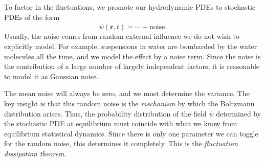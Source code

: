 \documentclass[a4paper]{article}
\begin{document}
To factor in the fluctuations, we promote our hydrodynamic PDEs to stochastic PDEs of the form
\[
  \dot{\psi}(\mathbf{r}, t) = \cdots + \text{noise}.
\]
Usually, the noise comes from random external influence we do not wish to explicitly model. For example, suspensions in water are bombarded by the water molecules all the time, and we model the effect by a noise term. Since the noise is the contribution of a large number of largely independent factors, it is reasonable to model it as Gaussian noise.

The mean noise will always be zero, and we must determine the variance. The key insight is that this random noise is the \emph{mechanism} by which the Boltzmann distribution arises. Thus, the probability distribution of the field $\psi$ determined by the stochastic PDE at equilibrium must coincide with what we know from equilibrium statistical dynamics. Since there is only one parameter we can toggle for the random noise, this determines it completely. This is the \emph{fluctuation dissipation theorem}.
\end{document}
